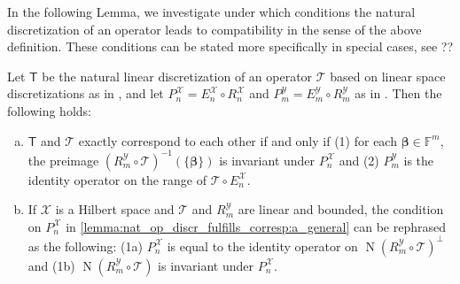 \documentclass[a4paper]{paper}
\newcommand{\Spc}[1]{\mathscr{#1}}
\newcommand{\Field}{\mathbb{F}}
\newcommand{\Op}[1]{\mathcal{#1}}
\newcommand{\DiscOp}[1]{\mathsf{#1}}
\newcommand*{\EXT}[2]{\ensuremath{E_{#1}^{#2}}}
\newcommand*{\REST}[2]{\ensuremath{R_{#1}^{#2}}}
\newcommand*{\PROJ}[2]{\ensuremath{P_{#1}^{#2}}}
\newcommand*{\RnX}{\ensuremath{\REST{n}{\Spc{X}}}}
\newcommand*{\RmY}{\ensuremath{\REST{m}{\Spc{Y}}}}
\newcommand*{\EnX}{\ensuremath{\EXT{n}{\Spc{X}}}}
\newcommand*{\EmY}{\ensuremath{\EXT{m}{\Spc{Y}}}}
\newcommand*{\PnX}{\ensuremath{\PROJ{n}{\Spc{X}}}}
\newcommand*{\PmY}{\ensuremath{\PROJ{m}{\Spc{Y}}}}
\DeclareMathOperator{\nullspace}{N}
\newcommand{\vbeta}{\boldsymbol{\beta}}
\begin{document}
In the following Lemma, we investigate under which conditions the natural discretization of an operator leads to 
compatibility in the sense of the above definition. These conditions can be stated more specifically in special cases, 
see ??

\begin{lemma}
 \label{lemma:nat_op_discr_fulfills_corresp}
 Let $\DiscOp{T}$ be the natural linear discretization of an operator $\Op{T}$ based on linear space discretizations as 
 in , and let $\PnX = \EnX \circ \RnX$ and $\PmY = \EmY \circ \RmY$ as in 
 . Then the following holds:
 
 \begin{enumerate}[(a)]
  \item \label{lemma:nat_op_discr_fulfills_corresp:a_general}
  $\DiscOp{T}$ and $\Op{T}$ exactly correspond to each other if and only if (1) for each $\vbeta \in \Field^m$, the 
  preimage $(\RmY \circ \Op{T})^{-1}(\{\vbeta\})$ is invariant under $\PnX$ and (2) $\PmY$ is the identity operator on 
  the range of $\Op{T} \circ \EnX$.

  \item \label{lemma:nat_op_discr_fulfills_corresp:b_hilbert_linear}
  If $\Spc{X}$ is a Hilbert space and $\Op{T}$ and $\RmY$ are linear and bounded, the condition on $\PnX$ in 
  \eqref{lemma:nat_op_discr_fulfills_corresp:a_general} can be rephrased as the following: (1a) $\PnX$ is equal to the 
  identity operator on $\nullspace(\RmY \circ \Op{T})^\perp$ and (1b) $\nullspace(\RmY \circ \Op{T})$ is invariant 
  under $\PnX$.
  
 \end{enumerate}
\end{lemma}
\end{document}
